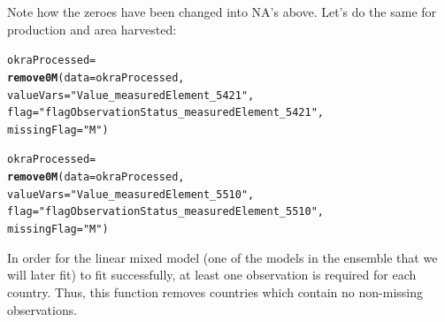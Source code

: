\documentclass[nojss]{jss}\usepackage[]{graphicx}\usepackage[]{color}
\makeatletter
\newcommand{\hlstr}[1]{\textcolor[rgb]{0.192,0.494,0.8}{#1}}%
\newcommand{\hlstd}[1]{\textcolor[rgb]{0.345,0.345,0.345}{#1}}%
\newcommand{\hlkwb}[1]{\textcolor[rgb]{0.69,0.353,0.396}{#1}}%
\newcommand{\hlkwc}[1]{\textcolor[rgb]{0.333,0.667,0.333}{#1}}%
\newcommand{\hlkwd}[1]{\textcolor[rgb]{0.737,0.353,0.396}{\textbf{#1}}}%
\newenvironment{kframe}{%
 \def\at@end@of@kframe{}%
 \ifinner\ifhmode%
  \def\at@end@of@kframe{\end{minipage}}%
  \begin{minipage}{\columnwidth}%
 \fi\fi%
 \def\FrameCommand##1{\hskip\@totalleftmargin \hskip-\fboxsep
 \colorbox{shadecolor}{##1}\hskip-\fboxsep
     \hskip-\linewidth \hskip-\@totalleftmargin \hskip\columnwidth}%
 \MakeFramed {\advance\hsize-\width
   \@totalleftmargin\z@ \linewidth\hsize
   \@setminipage}}%
 {\par\unskip\endMakeFramed%
 \at@end@of@kframe}
\newenvironment{knitrout}{}{} %
\makeatother
\begin{document}
Note how the zeroes have been changed into NA's above.  Let's do the same for
production and area harvested:

\begin{knitrout}
\color{fgcolor}\begin{kframe}
\begin{alltt}
\hlstd{okraProcessed} \hlkwb{=}
    \hlkwd{remove0M}\hlstd{(}\hlkwc{data} \hlstd{= okraProcessed,}
             \hlkwc{valueVars} \hlstd{=} \hlstr{"Value_measuredElement_5421"}\hlstd{,}
             \hlkwc{flag} \hlstd{=} \hlstr{"flagObservationStatus_measuredElement_5421"}\hlstd{,}
             \hlkwc{missingFlag} \hlstd{=} \hlstr{"M"}\hlstd{)}

\hlstd{okraProcessed} \hlkwb{=}
    \hlkwd{remove0M}\hlstd{(}\hlkwc{data} \hlstd{= okraProcessed,}
             \hlkwc{valueVars} \hlstd{=} \hlstr{"Value_measuredElement_5510"}\hlstd{,}
             \hlkwc{flag} \hlstd{=} \hlstr{"flagObservationStatus_measuredElement_5510"}\hlstd{,}
             \hlkwc{missingFlag} \hlstd{=} \hlstr{"M"}\hlstd{)}
\end{alltt}
\end{kframe}
\end{knitrout}


In order for the linear mixed model (one of the models in the ensemble that
we will later fit) to fit successfully, at least one
observation is required for each country. Thus, this function removes
countries which contain no non-missing observations.
\end{document}
